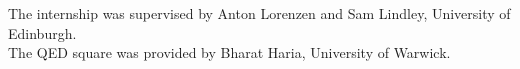 \documentclass[acmsmall,screen,nonacm]{acmart}
\makeatletter
\DeclareMathOperator{\llet}{\text{let}}
\DeclareMathOperator{\lin}{\text{in}}
\DeclareMathOperator{\case}{\text{case}}
\DeclareMathOperator{\bbox}{\text{box}}
\DeclareMathOperator{\unbox}{\text{unbox}}
\newcommand{\at}{\mathbin{\mbox{\small\ensuremath{@}}}}
\DeclareMathOperator{\inl}{\text{inl}}
\DeclareMathOperator{\inr}{\text{inr}}
\newcommand{\tee}{\vdash}
\makeatother
\begin{document}






\begin{acks}

The internship was supervised by Anton Lorenzen and Sam Lindley, University of Edinburgh. \\
The QED square was provided by Bharat Haria, University of Warwick.

\end{acks}



\end{document}
